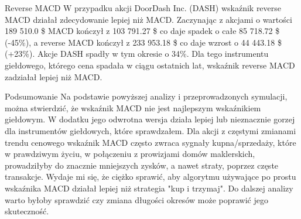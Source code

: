 \documentclass{article}
\begin{document}
\begin{section}{Reverse MACD}
    W przypadku akcji DoorDash Inc. (DASH) wskaźnik reverse MACD działał zdecydowanie lepiej niż MACD. Zaczynając z akcjami o wartości 189 510.0 \$
    MACD kończył z 103 791.27 \$ co daje spadek o całe 85 718.72 \$ (-45\%), a reverse MACD kończył z 233 953.18 \$ co daje wzrost o 44 443.18 \$ (+23\%). 
    Akcje DASH spadły w tym okresie o 34\%.
    Dla tego instrumentu giełdowego, którego cena spadała w ciągu ostatnich lat, wskaźnik reverse MACD zadziałał lepiej niż MACD.
\end{section}

\begin{section}{Podsumowanie}
    Na podstawie powyższej analizy i przeprowadzonych symulacji, można stwierdzić, że wskaźnik MACD nie jest najlepszym wskaźnikiem giełdowym.
    W dodatku jego odwrotna wersja działa lepiej lub nieznacznie gorzej dla instrumentów giełdowych, które sprawdzałem. Dla akcji z 
    częstymi zmianami trendu cenowego wskaźnik MACD często zwraca sygnały kupna/sprzedaży, które w prawdziwym życiu,
    w połączeniu z prowizjami domów maklerskich, prowadziłyby do znacznie mniejszych zysków, a nawet straty, poprzez częste transakcje. 
    Wydaje mi się, że ciężko sprawić, aby algorytmu używające po prostu wskaźnika MACD działał lepiej niż strategia "kup i trzymaj".
    Do dalszej analizy warto byłoby sprawdzić czy zmiana długości okresów może poprawić jego skuteczność.
\end{section}
\end{document}
